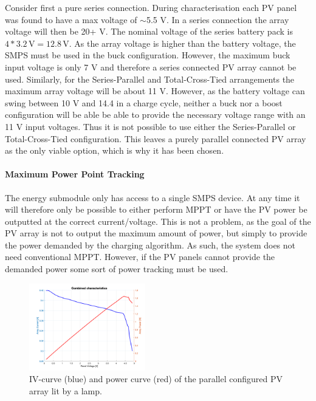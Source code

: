 \documentclass[a4paper]{article}
\newcommand{\unit}[1]{\ensuremath{\, \mathrm{#1}}}
\begin{document}
Consider first a pure series connection. During characterisation each PV 
panel was found to have a max voltage of  $\sim$5.5 V. In a series 
connection the array voltage will then be 20+ V. The nominal voltage of 
the series battery pack is \(4 * 3.2 \unit{V} = 12.8 \unit{V} \). As the 
array voltage is higher than the battery voltage, the SMPS must be used 
in the buck configuration. However, the maximum buck input voltage is 
only 7 V\cite{PMOS} and therefore a series connected PV array cannot be 
used. Similarly, for the Series-Parallel and Total-Cross-Tied arrangements 
the maximum array voltage will be about 11 V. However, as the battery 
voltage can swing between 10 V and 14.4 in a charge cycle, neither a 
buck nor a boost configuration will be able be able to provide the 
necessary voltage range with an 11 V input voltages. Thus it is not 
possible to use either the Series-Parallel or Total-Cross-Tied 
configuration. This leaves a purely parallel connected PV array as 
the only viable option, which is why it has been chosen. 

\paragraph*{Maximum Power Point Tracking}
The energy submodule only has access to a single SMPS device. At any time it 
will therefore only be possible to either perform MPPT or have the PV power 
be outputted at the correct current/voltage. This is not a problem, as the 
goal of the PV array is not to output the maximum amount of power, but simply 
to provide the power demanded by the charging algorithm. As such, the system 
does not need conventional MPPT. However, if the PV panels cannot provide the 
demanded power some sort of power tracking must be used. 

\begin{figure}
    \begin{center}
        \includegraphics[width=0.45\textwidth]{Combined.png}
    \vspace{-15pt}
    \end{center}
    \caption{IV-curve (blue) and power curve (red) of the parallel configured PV array lit by a lamp.}
    \label{fig:parallelArray}
\end{figure}
\end{document}
